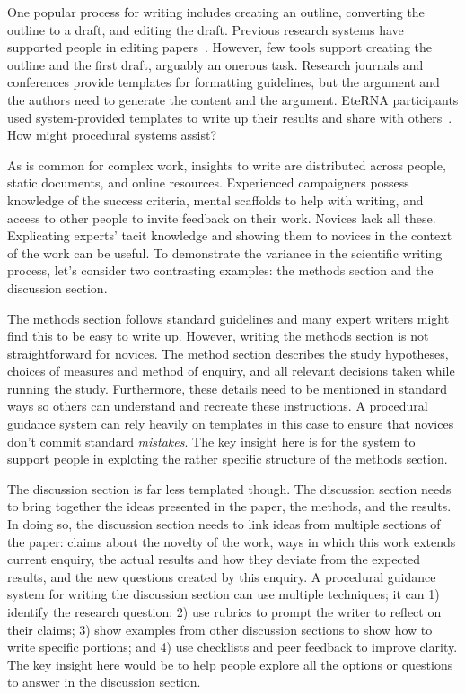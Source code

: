 
One popular process for writing includes creating an outline, converting the outline to a draft, and editing the draft. Previous research systems have supported people in editing papers~\cite{Bernstein2010a}. However, few tools support creating the outline and the first draft, arguably an onerous task. Research journals and conferences provide templates for formatting guidelines, but the argument and the authors need to generate the content and the argument. EteRNA participants used system-provided templates to write up their results and share with others~\cite{Lee2014}. How might procedural systems assist?

As is common for complex work, insights to write are distributed across people, static documents, and online resources. Experienced campaigners possess knowledge of the success criteria, mental scaffolds to help with writing, and access to other people to invite feedback on their work. Novices lack all these. Explicating experts' tacit knowledge and showing them to novices in the context of the work can be useful. To demonstrate the variance in the scientific writing process, let’s consider two contrasting examples: the methods section and the discussion section.

The methods section follows standard guidelines and many expert writers might find this to be easy to write up. However, writing the methods section is not straightforward for novices. The method section describes the study hypotheses, choices of measures and method of enquiry, and all relevant decisions taken while running the study. Furthermore, these details need to be mentioned in standard ways so others can understand and recreate these instructions. A procedural guidance system can rely heavily on templates in this case to ensure that novices don't commit standard \textit{mistakes}. The key insight here is for the system to support people in exploting the rather specific structure of the methods section.

The discussion section is far less templated though. The discussion section needs to bring together the ideas presented in the paper, the methods, and the results. In doing so, the discussion section needs to link ideas from multiple sections of the paper: claims about the novelty of the work, ways in which this work extends current enquiry, the actual results and how they deviate from the expected results, and the new questions created by this enquiry. A procedural guidance system for writing the discussion section can use multiple techniques; it can 1) identify the research question; 2) use rubrics to prompt the writer to reflect on their claims; 3) show examples from other discussion sections to show how to write specific portions; and 4) use checklists and peer feedback to improve clarity. The key insight here would be to help people explore all the options or questions to answer in the discussion section.

